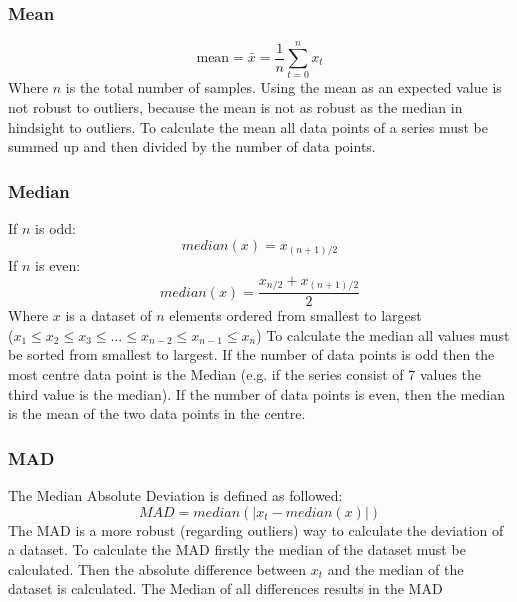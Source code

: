 \subsubsection{Mean}
\begin{equation}
  \text{mean} = \bar{x} = \frac{1}{n} \sum^n_{t=0}x_t
\end{equation}
Where $n$ is the total number of samples. Using the mean as an expected value is not robust to outliers, because the mean is not as robust as the median in hindsight to outliers. To calculate the mean all data points of a series must be summed up and then divided by the number of data points.
\subsubsection{Median}
If $n$ is odd:
\begin{equation}
  median(x) = x_{(n+1)/2}
\end{equation}
If $n$ is even:
\begin{equation}
  median(x) = \frac{x_{n/2} + x_{(n+1)/2}}{2}
\end{equation}
Where $x$ is a dataset of $n$ elements ordered from smallest to largest\\
($x_1 \leq x_2 \leq x_3 \leq \ldots \leq x_{n-2} \leq x_{n-1} \leq x_n$)
\cite{blazquez-garciaReviewOutlierAnomaly2020}
To calculate the median all values must be sorted from smallest to largest. If the number of data points is odd then the most centre data point is the Median (e.g. if the series consist of 7 values the third value is the median). If the number of data points is even, then the median is the mean of the two data points in the centre.
\subsubsection{\ac{MAD}}
The Median Absolute Deviation is defined as followed:
\begin{equation}
  MAD = median(|x_t - median(x)|)
\end{equation}
The \ac{MAD} is a more robust (regarding outliers) way to calculate the deviation of a dataset. To calculate the \ac{MAD} firstly the median of the dataset must be calculated. Then the absolute difference between $x_t$ and the median of the dataset is calculated. The Median of all differences results in the \ac{MAD}
\cite{leysDetectingOutliersNot2013, mehrangOutlierDetectionWeight2015}

